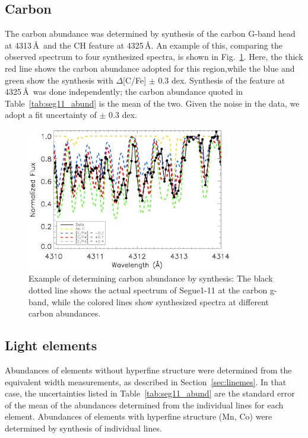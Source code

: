 \documentclass[manuscript]{aastex}
\begin{document}
\subsection{Carbon}
The carbon abundance was determined by synthesis of the carbon G-band head at 4313\,\AA\, and the CH feature at 4325\,\AA. An example of this, comparing the observed spectrum to four synthesized spectra, is shown in Fig.~\ref{fig:gband}. Here, the thick red line shows the carbon abundance adopted for this region,while the blue and green show the synthesis with $\Delta$[C/Fe] $\pm$ 0.3 dex. Synthesis of the feature at 4325\,\AA\, was done independently; the carbon abundance quoted in Table~\ref{tab:seg11_abund} is the mean of the two. Given the noise in the data, we adopt a fit uncertainty of $\pm$ 0.3 dex.

\begin{figure}
 \begin{center}
  \includegraphics[width=9cm]{CH_synth.ps}
  \caption{Example of determining carbon abundance by synthesis: The black dotted line shows the actual spectrum of Segue1-11 at the carbon g-band, while the colored lines show synthesized spectra at different carbon abundances. }
  \label{fig:gband}
 \end{center}
\end{figure} 
  



\subsection{Light elements}
Abundances of elements without hyperfine structure were determined from the equivalent width measurements, as described in Section~\ref{sec:linemes}. In that case, the uncertainties listed in Table~\ref{tab:seg11_abund} are the standard error of the mean of the abundances determined from the individual lines for each element. Abundances of elements with hyperfine structure (Mn, Co) were determined by synthesis of individual lines. 
\end{document}
